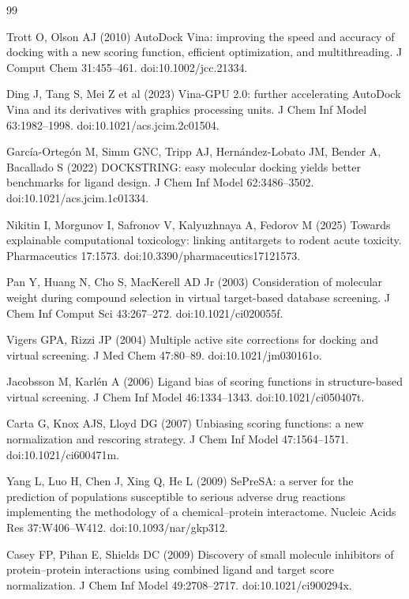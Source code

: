 \begin{thebibliography}{99}
\small

 Trott O, Olson AJ (2010) AutoDock Vina: improving the speed and
accuracy of docking with a new scoring function, efficient optimization, and
multithreading. J Comput Chem 31:455--461. doi:10.1002/jcc.21334.

 Ding J, Tang S, Mei Z et al (2023) Vina-GPU 2.0: further
accelerating AutoDock Vina and its derivatives with graphics processing units.
J Chem Inf Model 63:1982--1998. doi:10.1021/acs.jcim.2c01504.

 Garc\'ia-Orteg\'on M, Simm GNC, Tripp AJ,
Hern\'andez-Lobato JM, Bender A, Bacallado S (2022) DOCKSTRING: easy molecular
docking yields better benchmarks for ligand design. J Chem Inf Model
62:3486--3502. doi:10.1021/acs.jcim.1c01334.

 Nikitin I, Morgunov I, Safronov V, Kalyuzhnaya A,
Fedorov M (2025) Towards explainable computational toxicology: linking
antitargets to rodent acute toxicity. Pharmaceutics 17:1573.
doi:10.3390/pharmaceutics17121573.

 Pan Y, Huang N, Cho S, MacKerell AD Jr (2003) Consideration of
molecular weight during compound selection in virtual target-based database
screening. J Chem Inf Comput Sci 43:267--272. doi:10.1021/ci020055f.

 Vigers GPA, Rizzi JP (2004) Multiple active site corrections
for docking and virtual screening. J Med Chem 47:80--89. doi:10.1021/jm030161o.

 Jacobsson M, Karl\'en A (2006) Ligand bias of scoring
functions in structure-based virtual screening. J Chem Inf Model 46:1334--1343.
doi:10.1021/ci050407t.

 Carta G, Knox AJS, Lloyd DG (2007) Unbiasing scoring
functions: a new normalization and rescoring strategy. J Chem Inf Model
47:1564--1571. doi:10.1021/ci600471m.

 Yang L, Luo H, Chen J, Xing Q, He L (2009) SePreSA: a
server for the prediction of populations susceptible to serious adverse drug
reactions implementing the methodology of a chemical--protein interactome.
Nucleic Acids Res 37:W406--W412. doi:10.1093/nar/gkp312.

 Casey FP, Pihan E, Shields DC (2009) Discovery of small
molecule inhibitors of protein--protein interactions using combined ligand and
target score normalization. J Chem Inf Model 49:2708--2717.
doi:10.1021/ci900294x.


\end{thebibliography}
